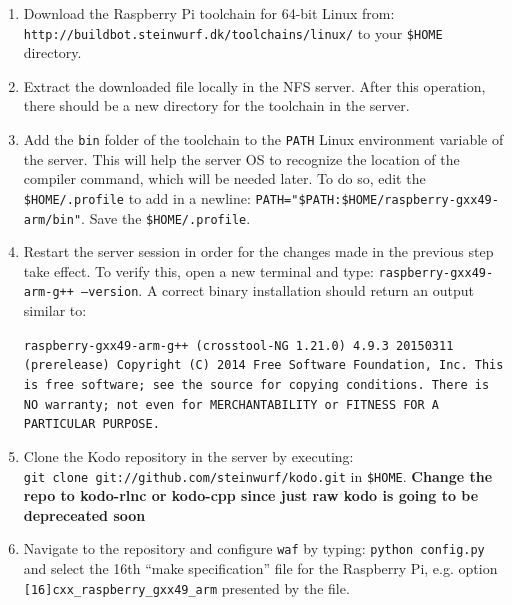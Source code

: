 \begin{enumerate}

\item Download the Raspberry Pi toolchain for 64-bit Linux from: \\
\texttt{http://buildbot.steinwurf.dk/toolchains/linux/} to your
\texttt{\$HOME} directory. \\

\item Extract the downloaded file locally in the NFS server. After
this operation, there should be a new directory for the toolchain
in the server. \\

\item Add the \texttt{bin} folder of the toolchain to the \texttt{PATH}
Linux environment variable of the server. This will help the server OS
to recognize the location of the compiler command, which will be needed
later. To do so, edit the \texttt{\$HOME/.profile} to add in a newline:
\texttt{PATH="\$PATH:\$HOME/raspberry-gxx49-arm/bin"}. Save the
\texttt{\$HOME/.profile}. \\

\item Restart the server session in order for the changes made in the
previous step take effect. To verify this, open a new terminal and type:
\texttt{raspberry-gxx49-arm-g++ --version}. A correct binary installation
should return an output similar to:

\texttt{raspberry-gxx49-arm-g++ (crosstool-NG 1.21.0) 4.9.3 20150311 (prerelease)
Copyright (C) 2014 Free Software Foundation, Inc.
This is free software; see the source for copying conditions.  There is NO
warranty; not even for MERCHANTABILITY or FITNESS FOR A PARTICULAR PURPOSE.} \\

\item Clone the Kodo repository in the server by executing: \\
\texttt{git clone git://github.com/steinwurf/kodo.git} in \texttt{\$HOME}. \textbf{Change the repo to kodo-rlnc or kodo-cpp since just raw kodo is going to be depreceated soon} \\

\item Navigate to the repository and configure \texttt{waf} by typing:
\texttt{python config.py} and select the 16th ``make specification'' file
for the Raspberry Pi, e.g. option \texttt{[16]cxx\_raspberry\_gxx49\_arm}
presented by the file.


\end{enumerate}
